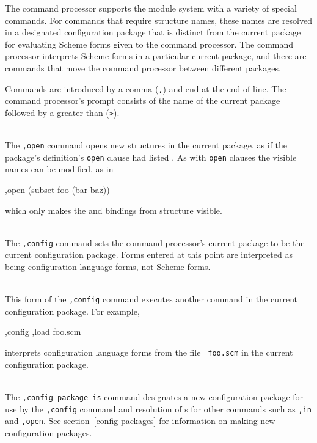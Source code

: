 The \hack{} command processor supports the module system with a
variety of special commands.  For commands that require structure
names, these names are resolved in a designated configuration package
that is distinct from the current package for evaluating Scheme forms
given to the command processor.  The command processor interprets
Scheme forms in a particular current package, and there are commands
that move the command processor between different packages.

Commands are introduced by a comma ({\tt,}) and end at the end of
line.  The command processor's prompt consists of the name of the
current package followed by a greater-than ({\tt>}).

\begin{description}
\item {} \\
    The {\tt,open} command opens new structures in the current
    package, as if the package's definition's {\tt open} clause
    had listed .
    As with {\tt open} clauses the visible names can be modified,
    as in
\begin{example}
,open (subset foo (bar baz))
\end{example}
    which only makes the  and  bindings from
    structure  visible.

\item {} \\
    The {\tt,config} command sets the command processor's current
    package to be the current configuration package.  Forms entered at
    this point are interpreted as being configuration language forms,
    not Scheme forms.

\item {} \\
    This form of the {\tt,config} command executes another command in
    the current configuration package.  For example,
\begin{example}
,config ,load foo.scm
\end{example}
    interprets configuration language forms from the file {\tt
    foo.scm} in the current configuration package.

\item {} \\
    The {\tt,config-package-is} command designates a new configuration
    package for use by the {\tt,config} command and resolution of
    s for other commands such as {\tt,in} and
    {\tt,open}.  See
    section~\ref{config-packages}
    for information on making new configuration packages.


\end{description}

